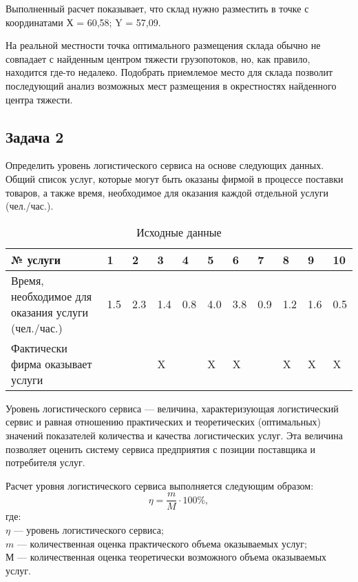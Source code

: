 Выполненный расчет показывает, что склад нужно разместить в точке с координатами Х = 60,58; Y = 57,09.

На реальной местности точка оптимального размещения склада обычно не совпадает с найденным центром тяжести грузопотоков, но, как правило, находится где-то недалеко.
Подобрать приемлемое место для склада позволит последующий анализ возможных мест размещения в окрестностях найденного центра тяжести.

\subsection*{Задача 2}
Определить уровень логистического сервиса на основе следующих данных.
Общий список услуг, которые могут быть оказаны фирмой в процессе поставки товаров, а также время, необходимое для оказания каждой отдельной услуги (чел./час.).

\begin{table}[h]
	\small
	\centering
	\caption{Исходные данные}
	\label{my-label}
	\setlength{\extrarowheight}{1mm}
	\begin{tabularx}{\textwidth}{|p{4.2cm}|K{0.8cm}|K{0.8cm}|K{0.8cm}|K{0.8cm}|K{0.8cm}|K{0.8cm}|K{0.8cm}|K{0.8cm}|K{0.8cm}|K{0.8cm}|}
		\hline
		№ услуги                                           & 1   & 2   & 3   & 4   & 5   & 6   & 7   & 8   & 9   & 10  \\ \hline
		Время, необходимое для оказания услуги (чел./час.) & 1.5 & 2.3 & 1.4 & 0.8 & 4.0 & 3.8 & 0.9 & 1.2 & 1.6 & 0.5 \\ \hline
		Фактически фирма оказывает услуги&&&X&&X&X&&X&X&X \\ \hline
	\end{tabularx}
\end{table}

Уровень логистического сервиса --- величина, характеризующая логистический сервис и равная отношению практических и теоретических (оптимальных) значений показателей количества и качества логистических услуг.
Эта величина позволяет оценить систему сервиса предприятия с позиции поставщика и потребителя услуг.

Расчет уровня логистического сервиса выполняется следующим образом:
\[ \eta = \dfrac{m}{M} \cdot 100\%, \]
где:\\
$\eta$ --- уровень логистического сервиса;\\
$m$ --- количественная оценка практического объема оказываемых услуг;\\
М --- количественная оценка теоретически возможного объема оказываемых услуг.

